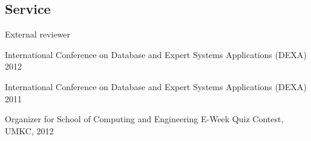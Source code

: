 \documentclass[margin,line]{resume}
\begin{document}
\begin{resume}
    \section{\mysidestyle Service}
    \begin{list2}
    \item External reviewer
    \begin{list3}
    \item International Conference on Database and Expert Systems Applications (DEXA) 2012
    \item International Conference on Database and Expert Systems Applications (DEXA) 2011
    \end{list3}
    \item Organizer for School of Computing and Engineering E-Week Quiz Contest, UMKC, 2012
    \end{list2}
 
\end{resume}
\end{document}
